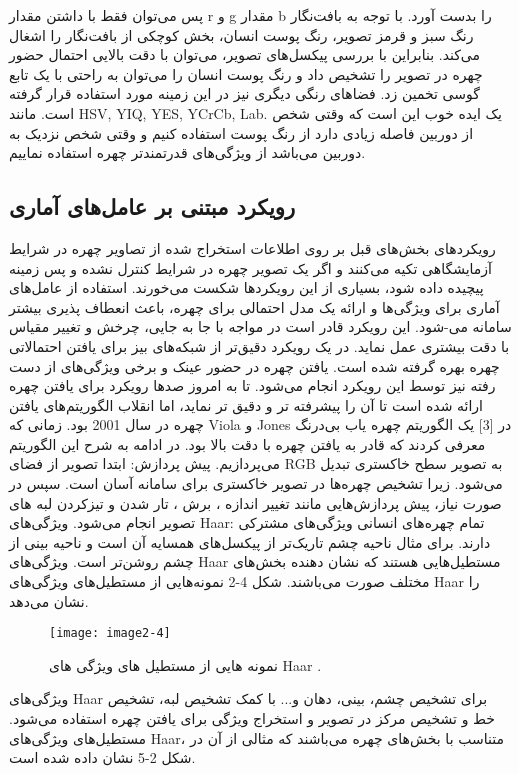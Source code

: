 پس می‌توان فقط با داشتن مقدار r و g مقدار b را بدست آورد. با توجه به بافت‌نگار  رنگ سبز و قرمز تصویر، رنگ پوست انسان، بخش کوچکی از بافت‌نگار را اشغال می‌کند. بنابراین با بررسی پیکسل‌های تصویر، می‌توان با دقت بالایی احتمال حضور چهره در تصویر را تشخیص داد و رنگ پوست انسان را می‌توان به راحتی با یک تابع گوسی تخمین زد. فضاهای رنگی دیگری نیز در این زمینه مورد استفاده قرار گرفته است. مانند HSV, YIQ, YES, YCrCb, Lab. یک ایده خوب این است که وقتی شخص از دوربین فاصله زیادی دارد از رنگ پوست استفاده کنیم و وقتی شخص نزدیک به دوربین می‌باشد از ویژگی‌های قدرتمندتر چهره استفاده نماییم.
\subsection{رویکرد مبتنی بر عامل‌های آماری}
رویکرد‌های بخش‌های قبل بر روی اطلاعات استخراج شده از تصاویر چهره در شرایط آزمایشگاهی تکیه می‌کنند و اگر یک تصویر چهره در شرایط کنترل نشده و پس زمینه پیچیده داده شود، بسیاری از این رویکردها شکست می‌خورند.
استفاده از عامل‌های آماری برای ویژگی‌ها و ارائه یک مدل احتمالی برای چهره، باعث انعطاف پذیری بیشتر سامانه می-شود. این رویکرد قادر است در مواجه با جا به جایی، چرخش و تغییر مقیاس با دقت بیشتری عمل نماید. در یک رویکرد دقیق‌تر از شبکه‌های بیز  برای یافتن احتمالاتی چهره بهره گرفته شده است. یافتن چهره در حضور عینک و برخی ویژگی‌های از دست رفته نیز توسط این رویکرد انجام می‌شود.
تا به امروز صدها رویکرد برای یافتن چهره ارائه شده است تا آن را پیشرفته تر و دقیق تر نماید، اما انقلاب الگوریتم‌های یافتن چهره در سال 2001 بود. زمانی که Viola و Jones در [3] یک الگوریتم چهره یاب بی‌درنگ معرفی کردند که قادر به یافتن چهره با دقت بالا بود. در ادامه به شرح این الگوریتم می‌پردازیم.
پیش پردازش: ابتدا تصویر از فضای RGB به تصویر سطح خاکستری تبدیل می‌شود. زیرا تشخیص چهره‌ها در تصویر خاکستری برای سامانه آسان است. سپس در صورت نیاز، پیش پردازش‌هایی مانند تغییر اندازه ، برش ، تار شدن  و تیزکردن لبه های تصویر انجام می‌شود. 
ویژگی‌های Haar: تمام چهره‌های انسانی ویژگی‌های مشترکی دارند. برای مثال ناحیه چشم تاریک‌تر از پیکسل‌های همسایه آن است و ناحیه بینی از چشم روشن‌تر است. ویژگی‌های Haar مستطیل‌هایی هستند که نشان دهنده بخش‌های مختلف صورت می‌باشند. شکل ‏2-4 نمونه‌هایی از مستطیل‌های ویژگی‌های Haar را نشان می‌دهد.
\begin{figure}[h]
\centering
  \texttt{[image: image2-4]}
  \caption{نمونه هایی از مستطیل های ویژگی های Haar \cite{ref1}.}
  \label{image2-4}
\end{figure}

ویژگی‌های‌ Haar برای تشخیص چشم، بینی، دهان و... با کمک تشخیص لبه، تشخیص خط و تشخیص مرکز در تصویر و استخراج ویژگی برای یافتن چهره استفاده می‌شود. مستطیل‌های ویژگی‌های Haar، متناسب با بخش‌های چهره می‌باشند که مثالی از آن در شکل 2-5 نشان داده شده است.

